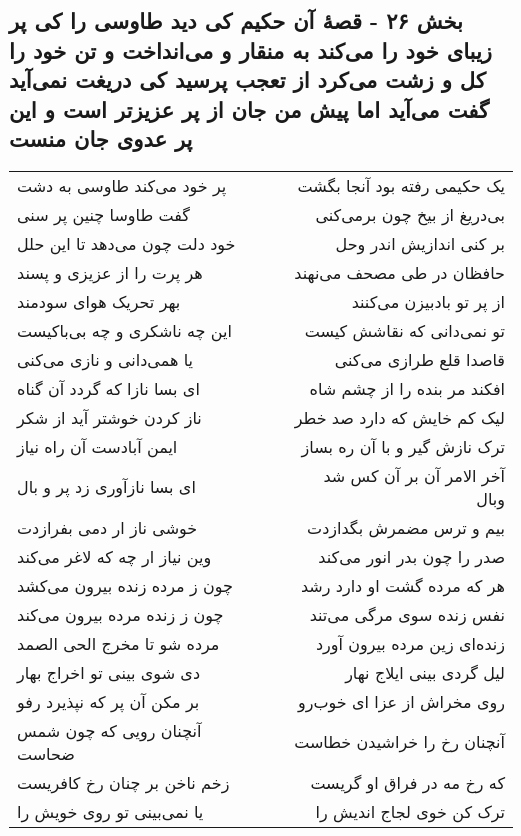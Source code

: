 \begin{center}
\section*{بخش ۲۶ - قصهٔ آن حکیم کی دید طاوسی را کی پر زیبای خود را می‌کند به منقار و می‌انداخت و تن خود را کل و زشت می‌کرد از تعجب پرسید کی دریغت نمی‌آید گفت می‌آید اما پیش من جان از پر عزیزتر است و این پر عدوی جان منست}
\label{sec:sh026}
\begin{longtable}{l p{0.5cm} r}
پر خود می‌کند طاوسی به دشت
&&
یک حکیمی رفته بود آنجا بگشت
\\
گفت طاوسا چنین پر سنی
&&
بی‌دریغ از بیخ چون برمی‌کنی
\\
خود دلت چون می‌دهد تا این حلل
&&
بر کنی اندازیش اندر وحل
\\
هر پرت را از عزیزی و پسند
&&
حافظان در طی مصحف می‌نهند
\\
بهر تحریک هوای سودمند
&&
از پر تو بادبیزن می‌کنند
\\
این چه ناشکری و چه بی‌باکیست
&&
تو نمی‌دانی که نقاشش کیست
\\
یا همی‌دانی و نازی می‌کنی
&&
قاصدا قلع طرازی می‌کنی
\\
ای بسا نازا که گردد آن گناه
&&
افکند مر بنده را از چشم شاه
\\
ناز کردن خوشتر آید از شکر
&&
لیک کم خایش که دارد صد خطر
\\
ایمن آبادست آن راه نیاز
&&
ترک نازش گیر و با آن ره بساز
\\
ای بسا نازآوری زد پر و بال
&&
آخر الامر آن بر آن کس شد وبال
\\
خوشی ناز ار دمی بفرازدت
&&
بیم و ترس مضمرش بگدازدت
\\
وین نیاز ار چه که لاغر می‌کند
&&
صدر را چون بدر انور می‌کند
\\
چون ز مرده زنده بیرون می‌کشد
&&
هر که مرده گشت او دارد رشد
\\
چون ز زنده مرده بیرون می‌کند
&&
نفس زنده سوی مرگی می‌تند
\\
مرده شو تا مخرج الحی الصمد
&&
زنده‌ای زین مرده بیرون آورد
\\
دی شوی بینی تو اخراج بهار
&&
لیل گردی بینی ایلاج نهار
\\
بر مکن آن پر که نپذیرد رفو
&&
روی مخراش از عزا ای خوب‌رو
\\
آنچنان رویی که چون شمس ضحاست
&&
آنچنان رخ را خراشیدن خطاست
\\
زخم ناخن بر چنان رخ کافریست
&&
که رخ مه در فراق او گریست
\\
یا نمی‌بینی تو روی خویش را
&&
ترک کن خوی لجاج اندیش را
\\
\end{longtable}
\end{center}

